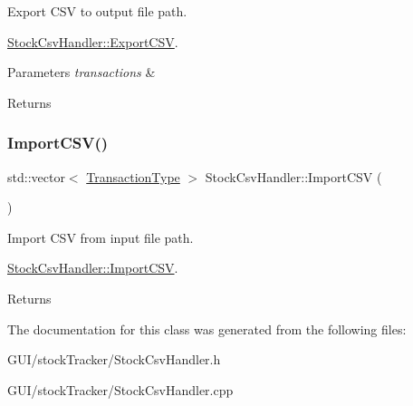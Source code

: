 Export C\+SV to output file path. 

\mbox{\hyperlink{class_stock_csv_handler_a5302fb4580cc69a73aa22a6e97e314ad}{Stock\+Csv\+Handler\+::\+Export\+C\+SV}}.


\begin{DoxyParams}{Parameters}
{\em transactions} & \\
\hline
\end{DoxyParams}
\begin{DoxyReturn}{Returns}

\end{DoxyReturn}
\mbox{\label{class_stock_csv_handler_a3b32398ef8bf2994162802496d721333}} 
\subsubsection{\texorpdfstring{Import\+C\+S\+V()}{ImportCSV()}}
{\footnotesize\ttfamily std\+::vector$<$ \mbox{\hyperlink{class_transaction_type}{Transaction\+Type}} $>$ Stock\+Csv\+Handler\+::\+Import\+C\+SV (\begin{DoxyParamCaption}{ }\end{DoxyParamCaption})}



Import C\+SV from input file path. 

\mbox{\hyperlink{class_stock_csv_handler_a3b32398ef8bf2994162802496d721333}{Stock\+Csv\+Handler\+::\+Import\+C\+SV}}.

\begin{DoxyReturn}{Returns}

\end{DoxyReturn}


The documentation for this class was generated from the following files\+:\begin{DoxyCompactItemize}
\item 
G\+U\+I/stock\+Tracker/Stock\+Csv\+Handler.\+h\item 
G\+U\+I/stock\+Tracker/Stock\+Csv\+Handler.\+cpp\end{DoxyCompactItemize}
